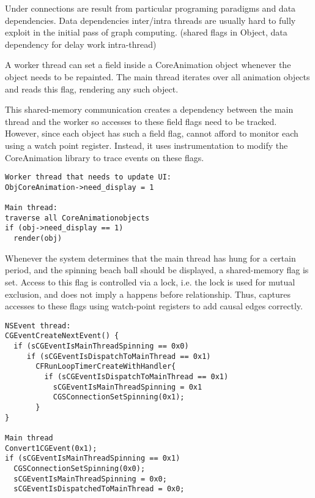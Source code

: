 Under connections are result from particular programing paradigms and data
dependencies. Data dependencies inter/intra threads are usually hard to fully
exploit in the initial pass of graph computing. (shared flags in Object, data
dependency for delay work intra-thread)

A worker thread can set a field  inside a CoreAnimation object
whenever the object needs to be repainted. The main thread iterates over all
animation objects and reads this flag, rendering any such object.

This shared-memory communication creates a dependency between the main thread
and the worker so accesses to these field flags need to be tracked.  However,
since each object has such a field flag, \xxx cannot afford to monitor each
using a watch point register.  Instead, it uses instrumentation to modify the
CoreAnimation library to trace events on these flags.

{\footnotesize \begin{verbatim}
Worker thread that needs to update UI:
ObjCoreAnimation->need_display = 1

Main thread: 
traverse all CoreAnimationobjects
if (obj->need_display == 1)
  render(obj)

\end{verbatim}
}

Whenever the system determines that the main thread has hung for a certain
period, and the spinning beach ball should be displayed, a shared-memory flag
is set. Access to this flag is controlled via a lock, i.e. the lock is used for
mutual exclusion, and does not imply a happens before relationship.  Thus, \xxx
captures accesses to these flags using watch-point registers to add causal
edges correctly.

{\footnotesize \begin{verbatim}
NSEvent thread:
CGEventCreateNextEvent() {
  if (sCGEventIsMainThreadSpinning == 0x0)
     if (sCGEventIsDispatchToMainThread == 0x1)
       CFRunLoopTimerCreateWithHandler{
         if (sCGEventIsDispatchToMainThread == 0x1)
           sCGEventIsMainThreadSpinning = 0x1
           CGSConnectionSetSpinning(0x1);
       }
}

Main thread
Convert1CGEvent(0x1);
if (sCGEventIsMainThreadSpinning == 0x1)
  CGSConnectionSetSpinning(0x0);
  sCGEventIsMainThreadSpinning = 0x0;
  sCGEventIsDispatchedToMainThread = 0x0;
\end{verbatim}
}


